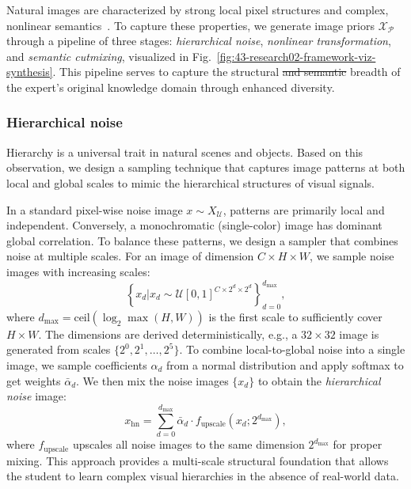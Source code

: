 \documentclass[12pt, a4paper, twoside]{book}
\makeatletter
\numberwithin{equation}{chapter}
\theoremstyle{plain}
\theoremstyle{definition}
\theoremstyle{remark}
\newenvironment{foldable}{}{}
\newcommand*{\eg}{e.g.}
\providecommand{\DIFdeltex}[1]{{\protect\color{red}\sout{#1}}} %
\providecommand{\DIFdelbegin}{} %
\providecommand{\DIFdelend}{} %
\providecommand{\DIFdel}[1]{\texorpdfstring{\DIFdeltex{#1}}{}} %
\newcommand{\DIFscaledelfig}{0.5}
\newlength{\DIFdelgraphicswidth} %
\newlength{\DIFdelgraphicsheight} %
\newcommand{\DIFdelincludegraphics}[2][]{%
\sbox{\DIFdelgraphicsbox}{\DIFOincludegraphics[#1]{#2}}%
\settoboxwidth{\DIFdelgraphicswidth}{\DIFdelgraphicsbox} %
\settoboxtotalheight{\DIFdelgraphicsheight}{\DIFdelgraphicsbox} %
\scalebox{\DIFscaledelfig}{%
\parbox[b]{\DIFdelgraphicswidth}{\usebox{\DIFdelgraphicsbox}\\[-\baselineskip] \rule{\DIFdelgraphicswidth}{0em}}\llap{\resizebox{\DIFdelgraphicswidth}{\DIFdelgraphicsheight}{%
\setlength{\unitlength}{\DIFdelgraphicswidth}%
\begin{picture}(1,1)%
\thicklines\linethickness{2pt} %
{\color[rgb]{1,0,0}\put(0,0){\framebox(1,1){}}}%
{\color[rgb]{1,0,0}\put(0,0){\line( 1,1){1}}}%
{\color[rgb]{1,0,0}\put(0,1){\line(1,-1){1}}}%
\end{picture}%
}\hspace*{3pt}}} %
} %
\DeclareRobustCommand{\DIFdelbegin}{\DIFOdelbegin \let\includegraphics\DIFdelincludegraphics} %
\DeclareRobustCommand{\DIFdelend}{\DIFOaddend \let\includegraphics\DIFOincludegraphics} %
\let\sout@orig\sout %
\renewcommand{\sout}[1]{\ifmmode\text{\sout@orig{\ensuremath{#1}}}\else\sout@orig{#1}\fi} %
\makeatother
\begin{document}
\begin{foldable} Natural images are characterized by strong local pixel structures and complex, nonlinear semantics~\cite{lecun1998gradient}.
  To capture these properties, we generate image priors $\mathcal{X}_\mathcal{P}$ through a pipeline of three stages: \textit{hierarchical noise}, \textit{nonlinear transformation}, and \textit{semantic cutmixing}, visualized in Fig.~\ref{fig:43-research02-framework-viz-synthesis}.
  This pipeline serves to capture the structural \DIFdelbegin \DIFdel{and semantic }\DIFdelend breadth of the expert's original knowledge domain through enhanced diversity.
\end{foldable}

\subsubsection{Hierarchical noise} \label{sec:43-research02-framework-synthesis-hiernoise}
\begin{foldable} Hierarchy is a universal trait in natural scenes and objects.
  Based on this observation, we design a sampling technique that captures image patterns at both local and global scales to mimic the hierarchical structures of visual signals.
\end{foldable}

\begin{foldable} In a standard pixel-wise noise image $x \sim X_\mathcal{U}$, patterns are primarily local and independent.
  Conversely, a monochromatic (single-color) image has dominant global correlation.
  To balance these patterns, we design a sampler that combines noise at multiple scales.
  For an image of dimension $C \times H \times W$, we sample noise images with increasing scales:
  \begin{equation} \label{eq:synthesis-hiernoise-multiscale}
    \left\{ x_{d} |x_{d} \sim \mathcal{U}[0,1]^{C\times2^{d}\times2^{d}} \right\}_{d=0}^{d_\text{max}},
  \end{equation}
  where $d_\text{max} = \text{ceil}(\log_{2} \max(H, W))$ is the first scale to sufficiently cover $H\times W$.
  The dimensions are derived deterministically, \eg, a $32 \times 32$ image is generated from scales $\{2^0, 2^1, \ldots, 2^5\}$.
  To combine local-to-global noise into a single image, we sample coefficients $\alpha_d$ from a normal distribution and apply softmax to get weights $\bar{\alpha}_{d}$.
  We then mix the noise images $\{x_d\}$ to obtain the \textit{hierarchical noise} image:
  \begin{equation} \label{eq:synthesis-hiernoise-combine}
    x_\text{hn} = \sum_{d=0}^{d_\text{max}} \bar{\alpha}_{d} \cdot f_\text{upscale}\left(x_{d};2^{d_\text{max}}\right),
  \end{equation}
  where $f_\text{upscale}$ upscales all noise images to the same dimension $2^{d_\text{max}}$ for proper mixing.
  This approach provides a multi-scale structural foundation that allows the student to learn complex visual hierarchies in the absence of real-world data.
\end{foldable}
\end{document}
